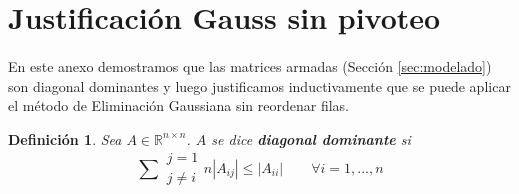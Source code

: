\documentclass[12pt]{article}
\newtheorem{defi}{Definición}
\begin{document}
\pagebreak
\appendix 

\renewcommand{\thesection}{\Roman{section}}

\section{Justificación Gauss sin pivoteo} 
\label{appendix:justificacion}

\paragraph{} En este anexo demostramos que las matrices armadas (Sección \ref{sec:modelado}) son diagonal dominantes y luego justificamos inductivamente que se puede aplicar el método de Eliminación Gaussiana sin reordenar filas.

\begin{defi}
Sea \(A \in \mathbb{R}^{n \times n}\). \(A\) se dice \textbf{diagonal dominante} si 
\[
  \sum{\substack{j = 1 \\ j \neq i}}{n}|A_{ij}| \leq  |A_{ii}| \qquad \forall i = 1, ..., n
\]
\end{defi}
\end{document}
